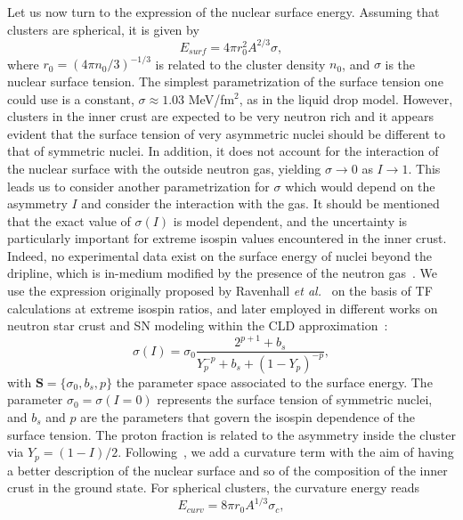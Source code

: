 Let us now turn to the expression of the nuclear surface energy. Assuming that
clusters are spherical, it is given by
%
\begin{equation}
  E_{surf} = 4\pi r_0^2A^{2/3}\sigma,\label{eq:esurf}
\end{equation}
%
where $r_0 = (4\pi n_0/3)^{-1/3}$ is related to the cluster density $n_0$, and
$\sigma$ is the nuclear surface tension. The simplest parametrization of the
surface tension one could use is a constant, $\sigma \approx 1.03$ MeV/fm$^2$, 
as in the liquid drop model. %
However, clusters in the inner crust are expected to be very neutron rich and
it appears evident that the surface tension of very asymmetric nuclei should be
different to that of symmetric nuclei. In addition, it does not account for
the interaction of the nuclear surface with the outside neutron gas, yielding 
$\sigma \rightarrow 0$ as $I\rightarrow 1$. 
This leads us to consider another parametrization for $\sigma$ which would 
depend on the asymmetry $I$ and consider the interaction with the gas.
It should be mentioned that the exact value of $\sigma(I)$ is model dependent, 
and the uncertainty is particularly important for extreme isospin values 
encountered in the inner crust. Indeed, no experimental data exist on the 
surface energy of nuclei beyond the dripline, which is in-medium modified by 
the presence of the neutron gas~\cite{Douchin2000b}.
We use the expression originally proposed by Ravenhall \textit{et
al.}~\cite{Ravenhall1983} on the basis of TF calculations at
extreme isospin ratios, and later employed in different works on neutron star
crust and SN modeling within the 
CLD approximation~\cite{Lattimer1991,Newton2012,Lorenz1993}:
%
\begin{equation}
  \sigma(I) = \sigma_0\frac{2^{p+1} + b_s}{Y_p^{-p} + b_s + (1 -
  Y_p)^{-p}},\label{eq:sigma}
\end{equation}
%
with $\bm{S} = \{\sigma_0, b_s, p\}$ the parameter space associated to the
surface energy. The parameter $\sigma_0 = \sigma(I=0)$ represents the surface 
tension of symmetric nuclei, and $b_s$ and $p$ are the parameters that govern 
the isospin dependence of the surface tension. The proton fraction is 
related to the asymmetry inside the cluster via $Y_p = (1-I)/2$. 
Following~\cite{Newton2012}, we add a curvature term with the aim of having a
better description of the nuclear surface and so of the composition of the
inner crust in the ground state. For spherical clusters, the curvature energy
reads
%
\begin{equation}
  E_{curv} = 8\pi r_0A^{1/3}\sigma_c,\label{eq:ecurv}
\end{equation}
